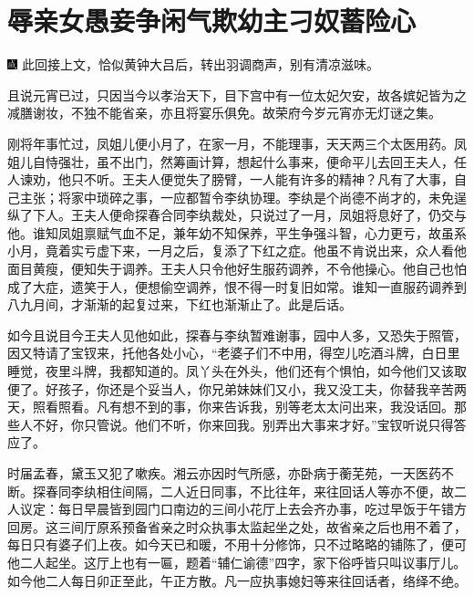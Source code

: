 

\chapter{辱亲女愚妾争闲气\hspace{.5em}欺幼主刁奴蓄险心}

{\includegraphics[width=3mm]{../Images/00005}  \kaishu 此回接上文，恰似黄钟大吕后，转出羽调商声，别有清凉滋味。}

且说元宵已过，只因当今以孝治天下，目下宫中有一位太妃欠安，故各嫔妃皆为之减膳谢妆，不独不能省亲，亦且将宴乐俱免。故荣府今岁元宵亦无灯谜之集。

刚将年事忙过，凤姐儿便小月了，在家一月，不能理事，天天两三个太医用药。凤姐儿自恃强壮，虽不出门，然筹画计算，想起什么事来，便命平儿去回王夫人，任人谏劝，他只不听。王夫人便觉失了膀臂，一人能有许多的精神？凡有了大事，自己主张；将家中琐碎之事，一应都暂令李纨协理。李纨是个尚德不尚才的，未免逞纵了下人。王夫人便命探春合同李纨裁处，只说过了一月，凤姐将息好了，仍交与他。谁知凤姐禀赋气血不足，兼年幼不知保养，平生争强斗智，心力更亏，故虽系小月，竟着实亏虚下来，一月之后，复添了下红之症。他虽不肯说出来，众人看他面目黄瘦，便知失于调养。王夫人只令他好生服药调养，不令他操心。他自己也怕成了大症，遗笑于人，便想偷空调养，恨不得一时复旧如常。谁知一直服药调养到八九月间，才渐渐的起复过来，下红也渐渐止了。此是后话。

如今且说目今王夫人见他如此，探春与李纨暂难谢事，园中人多，又恐失于照管，因又特请了宝钗来，托他各处小心，“老婆子们不中用，得空儿吃酒斗牌，白日里睡觉，夜里斗牌，我都知道的。凤丫头在外头，他们还有个惧怕，如今他们又该取便了。好孩子，你还是个妥当人，你兄弟妹妹们又小，我又没工夫，你替我辛苦两天，照看照看。凡有想不到的事，你来告诉我，别等老太太问出来，我没话回。那些人不好，你只管说。他们不听，你来回我。别弄出大事来才好。”宝钗听说只得答应了。

时届孟春，黛玉又犯了嗽疾。湘云亦因时气所感，亦卧病于蘅芜苑，一天医药不断。探春同李纨相住间隔，二人近日同事，不比往年，来往回话人等亦不便，故二人议定：每日早晨皆到园门口南边的三间小花厅上去会齐办事，吃过早饭于午错方回房。这三间厅原系预备省亲之时众执事太监起坐之处，故省亲之后也用不着了，每日只有婆子们上夜。如今天已和暖，不用十分修饰，只不过略略的铺陈了，便可他二人起坐。这厅上也有一匾，题着“辅仁谕德”四字，家下俗呼皆只叫议事厅儿。如今他二人每日卯正至此，午正方散。凡一应执事媳妇等来往回话者，络绎不绝。

